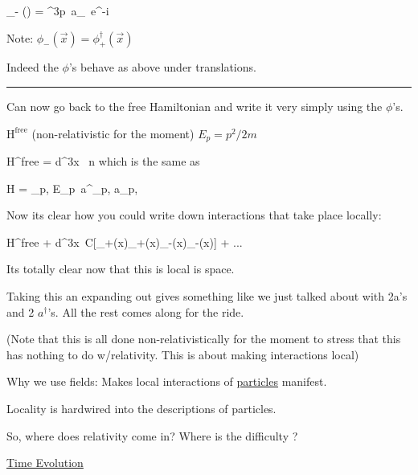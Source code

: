 {\be
\phi_- () = \int {}^3p\ a_{}\ e^{-i  }
\ee

Note: $\phi_- (\vec{x}) = \phi^\dagger_+ (\vec{x})$

Indeed the $\phi$'s behave as above under translations.

\noindent\rule{\textwidth}{1pt}

Can now go back to the free Hamiltonian and write it very simply using the $\phi$'s.


$\textrm{H}^{\textrm{free}}$ (non-relativistic for the moment) $E_p = p^2/2m$

\be
\textrm{H}^{\textrm{free}} = \int d^3x\ 
\ee
n
which is the same as 

\be
H = \sum\limits_{p,\sigma} E_p\ a^\dagger_{p,\sigma} a_{p,\sigma}
\ee


Now its clear how you could write down interactions that take place locally:

\be
\textrm{H}^{\textrm{free}} + \int d^3x\ C[\phi_+(x)\phi_+(x)\phi_-(x)\phi_-(x)] + ... 
\ee

Its totally clear now that this is local is space. 

Taking this an expanding out gives something like we just talked about with 2a's and 2 $a^\dagger$'s.
All the rest comes along for the ride. 

(Note that this is all done non-relativistically for the moment to stress that this has nothing to do w/relativity.
This is about making interactions local)

Why we use fields: Makes local interactions of \underline{particles} manifest.

Locality is hardwired into the descriptions of particles.

So, where does relativity come in?  Where is the difficulty ?

\underline{Time Evolution}

}
